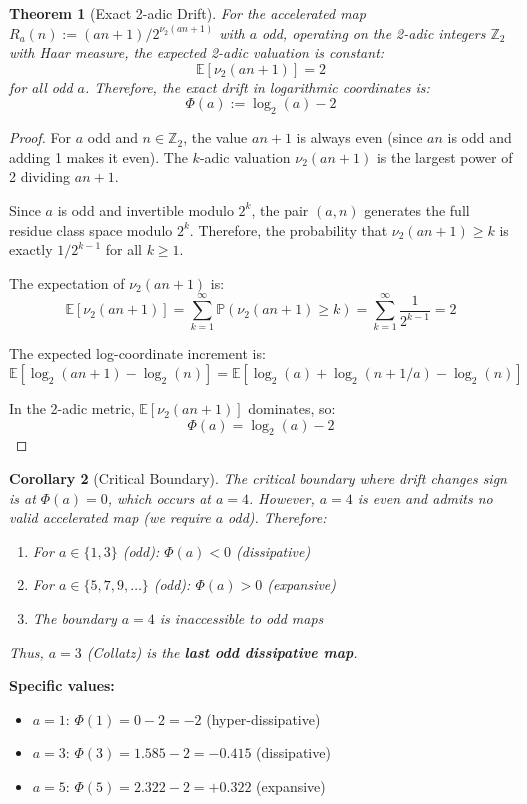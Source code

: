\documentclass[11pt,a4paper]{article}
\theoremstyle{plain}
\newtheorem{theorem}{Theorem}[section]
\newtheorem{corollary}[theorem]{Corollary}
\theoremstyle{definition}
\theoremstyle{remark}
\newcommand{\Z}{\mathbb{Z}}
\newcommand{\E}{\mathbb{E}}
\newcommand{\P}{\mathbb{P}}
\begin{document}
\begin{theorem}[Exact 2-adic Drift]
\label{thm:drift}
For the accelerated map $R_a(n) := (an+1) / 2^{\nu_2(an+1)}$ with $a$ odd, operating on the 2-adic integers $\Z_2$ with Haar measure, the expected 2-adic valuation is constant:
\[
\E[\nu_2(an+1)] = 2
\]
for all odd $a$. Therefore, the exact drift in logarithmic coordinates is:
\[
\Phi(a) := \log_2(a) - 2
\]
\end{theorem}

\begin{proof}
For $a$ odd and $n \in \Z_2$, the value $an+1$ is always even (since $an$ is odd and adding 1 makes it even). The $k$-adic valuation $\nu_2(an+1)$ is the largest power of 2 dividing $an+1$.

Since $a$ is odd and invertible modulo $2^k$, the pair $(a,n)$ generates the full residue class space modulo $2^k$. Therefore, the probability that $\nu_2(an+1) \ge k$ is exactly $1/2^{k-1}$ for all $k \ge 1$.

The expectation of $\nu_2(an+1)$ is:
\[
\E[\nu_2(an+1)] = \sum_{k=1}^{\infty} \P(\nu_2(an+1) \ge k) = \sum_{k=1}^{\infty} \frac{1}{2^{k-1}} = 2
\]

The expected log-coordinate increment is:
\[
\E[\log_2(an+1) - \log_2(n)] = \E[\log_2(a) + \log_2(n+1/a) - \log_2(n)]
\]

In the 2-adic metric, $\E[\nu_2(an+1)]$ dominates, so:
\[
\Phi(a) = \log_2(a) - 2
\]
\end{proof}

\begin{corollary}[Critical Boundary]
\label{cor:boundary}
The critical boundary where drift changes sign is at $\Phi(a) = 0$, which occurs at $a = 4$. However, $a=4$ is even and admits no valid accelerated map (we require $a$ odd). Therefore:
\begin{enumerate}
    \item For $a \in \{1,3\}$ (odd): $\Phi(a) < 0$ (dissipative)
    \item For $a \in \{5,7,9,\ldots\}$ (odd): $\Phi(a) > 0$ (expansive)
    \item The boundary $a=4$ is inaccessible to odd maps
\end{enumerate}

Thus, $a=3$ (Collatz) is the \textbf{last odd dissipative map}.
\end{corollary}

\textbf{Specific values:}
\begin{itemize}
    \item $a=1$: $\Phi(1) = 0 - 2 = -2$ (hyper-dissipative)
    \item $a=3$: $\Phi(3) = 1.585 - 2 = -0.415$ (dissipative)
    \item $a=5$: $\Phi(5) = 2.322 - 2 = +0.322$ (expansive)
\end{itemize}
\end{document}
